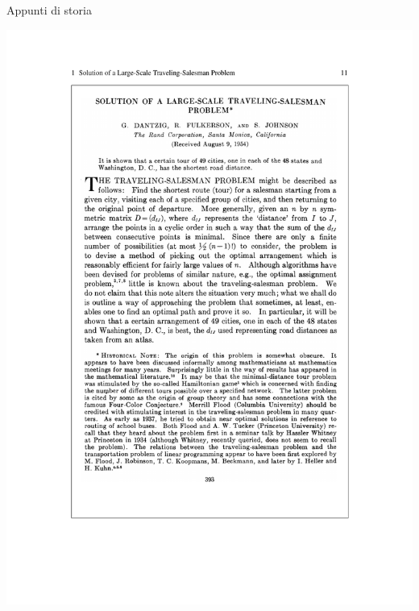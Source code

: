 \begin{OnlySlides}{Appunti di storia}
    
\includegraphics[width=\textwidth]{dantzig-2.pdf}

\end{OnlySlides}

